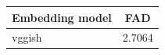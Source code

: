 \begin{tabularx}{\textwidth}{lc}
  \hline
  Embedding model & FAD \\
  \hline
  vggish & 2.7064 \\
  \hline
\end{tabularx}
